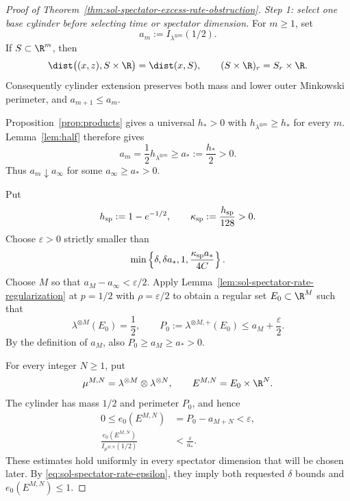 \documentclass[../main.tex]{subfiles}
\begin{document}
\begin{proof}[Proof of Theorem~\ref{thm:sol-spectator-excess-rate-obstruction}]
\emph{Step 1: select one base cylinder before selecting time or spectator dimension.}
For $m\ge1$, set
\[
  a_m:=I_{\lambda^{\otimes m}}(1/2).
\]
If $S\subset\R^m$, then
\[
  \dist\bigl((x,z),S\times\R\bigr)=\dist(x,S),
  \qquad
  (S\times\R)_r=S_r\times\R.
\]
Consequently cylinder extension preserves both mass and lower outer Minkowski perimeter, and
$a_{m+1}\le a_m$.

Proposition~\ref{prop:products} gives a universal $h_*>0$ with
$h_{\lambda^{\otimes m}}\ge h_*$ for every $m$.  Lemma~\ref{lem:half} therefore gives
\begin{equation}
  a_m=\frac12h_{\lambda^{\otimes m}}\ge a_*:=\frac{h_*}{2}>0.
  \label{eq:sol-spectator-rate-profile-floor}
\end{equation}
Thus $a_m\downarrow a_\infty$ for some $a_\infty\ge a_*>0$.

Put
\[
  h_{\rm sp}:=1-e^{-1/2},
  \qquad
  \kappa_{\rm sp}:=\frac{h_{\rm sp}}{128}>0.
\]
Choose $\varepsilon>0$ strictly smaller than
\begin{equation}
  \min\left\{\delta,\delta a_*,1,
  \frac{\kappa_{\rm sp}a_*}{4C}\right\}.
  \label{eq:sol-spectator-rate-epsilon}
\end{equation}
Choose $M$ so that $a_M-a_\infty<\varepsilon/2$.  Apply
Lemma~\ref{lem:sol-spectator-rate-regularization} at $p=1/2$ with $\rho=\varepsilon/2$ to
obtain a regular set $E_0\subset\R^M$ such that
\begin{equation}
  \lambda^{\otimes M}(E_0)=\frac12,
  \qquad
  P_0:=\lambda^{\otimes M,+}(E_0)\le a_M+\frac\varepsilon2.
  \label{eq:sol-spectator-rate-base}
\end{equation}
By the definition of $a_M$, also $P_0\ge a_M\ge a_*>0$.

For every integer $N\ge1$, put
\[
  \mu^{M,N}=\lambda^{\otimes M}\otimes\lambda^{\otimes N},
  \qquad
  E^{M,N}=E_0\times\R^N.
\]
The cylinder has mass $1/2$ and perimeter $P_0$, and hence
\begin{align}
  0\le e_0(E^{M,N})
  &=P_0-a_{M+N}<\varepsilon,
  \label{eq:sol-spectator-rate-additive}\\
  \frac{e_0(E^{M,N})}{I_{\mu^{M,N}}(1/2)}
  &<\frac{\varepsilon}{a_*}.
  \label{eq:sol-spectator-rate-relative}
\end{align}
These estimates hold uniformly in every spectator dimension that will be chosen later.  By
\eqref{eq:sol-spectator-rate-epsilon}, they imply both requested $\delta$ bounds and
$e_0(E^{M,N})\le1$.


\end{proof}
\end{document}
